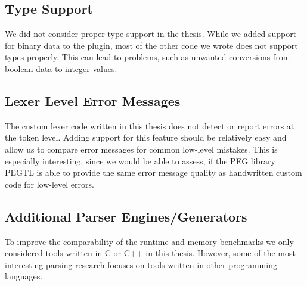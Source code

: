 \subsection{Type Support}

We did not consider proper type support in the thesis. While we added support for binary data to the \LinkYAMLCPP{} plugin, most of the other code we wrote does not support types properly. This can lead to problems, such as \href{https://issues.libelektra.org/2833}{unwanted conversions from boolean data to integer values}.

\subsection{Lexer Level Error Messages}

The custom lexer code written in this thesis does not detect or report errors at the token level. Adding support for this feature should be relatively easy and allow us to compare error messages for common low-level mistakes. This is especially interesting, since we would be able to assess, if the PEG library \gls{PEGTL} is able to provide the same error message quality as handwritten custom code for low-level errors.

\subsection{Additional Parser Engines/Generators}

To improve the comparability of the runtime and memory benchmarks we only considered tools written in C or C++ in this thesis. However, some of the most interesting parsing research focuses on tools written in other programming languages.

